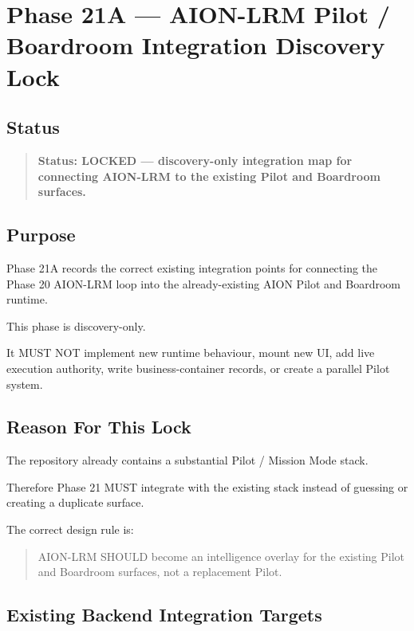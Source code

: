 \section{Phase 21A --- AION-LRM Pilot / Boardroom Integration Discovery Lock}
\label{sec:phase21a-lrm-pilot-boardroom-integration-discovery-lock}

\subsection{Status}

\begin{quote}
\textbf{Status: LOCKED --- discovery-only integration map for connecting AION-LRM to the existing Pilot and Boardroom surfaces.}
\end{quote}

\subsection{Purpose}

Phase 21A records the correct existing integration points for connecting the Phase 20 AION-LRM loop into the already-existing AION Pilot and Boardroom runtime.

This phase is discovery-only.

It MUST NOT implement new runtime behaviour, mount new UI, add live execution authority, write business-container records, or create a parallel Pilot system.

\subsection{Reason For This Lock}

The repository already contains a substantial Pilot / Mission Mode stack.

Therefore Phase 21 MUST integrate with the existing stack instead of guessing or creating a duplicate surface.

The correct design rule is:

\begin{quote}
AION-LRM SHOULD become an intelligence overlay for the existing Pilot and Boardroom surfaces, not a replacement Pilot.
\end{quote}

\subsection{Existing Backend Integration Targets}

